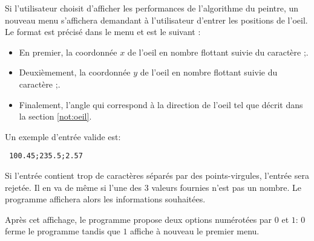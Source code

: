 Si l'utilisateur choisit d'afficher les performances de l'algorithme
du peintre, un nouveau menu s'affichera demandant à l'utilisateur
d'entrer les positions de l'oeil. Le format est précisé
dans le menu et est le suivant :
\begin{itemize}
\item En premier, la coordonnée $x$ de l'oeil en nombre
  flottant suivie du caractère \og;\fg{}.
\item Deuxièmement, la coordonnée $y$ de l'oeil en
  nombre flottant suivie du caractère \og;\fg.
\item Finalement, l'angle qui correspond à la direction
  de l'oeil tel que décrit dans la section \ref{not:oeil}.
\end{itemize}
Un exemple d'entrée valide est:
\begin{center}
  \texttt{
    100.45;235.5;2.57
  }
\end{center}

Si l'entrée contient trop de caractères séparés par des points-virgules,
l'entrée sera rejetée. Il en va de même si l'une des 3 valeurs fournies
n'est pas un nombre.
Le programme affichera alors les informations souhaitées.

Après cet affichage, le programme propose deux options numérotées par
$0$ et $1$: $0$ ferme le programme tandis que $1$ affiche à nouveau
le premier menu.


